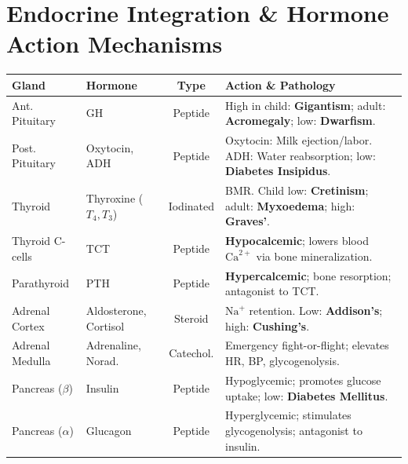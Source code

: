 \documentclass[10pt,twoside,openright]{book}
\begin{document}
\section{Endocrine Integration \& Hormone Action Mechanisms}

\begin{conceptbox}
\begin{center}
\scriptsize
\setlength{\tabcolsep}{2.5pt}
\renewcommand{\arraystretch}{1.15}
\begin{tabularx}{\linewidth}{|>{\raggedright\arraybackslash}p{1.6cm}|>{\raggedright\arraybackslash}p{1.8cm}|c|X|}
\hline
\textbf{Gland} & \textbf{Hormone} & \textbf{Type} & \textbf{Action \& Pathology} \\
\hline
Ant. Pituitary & GH & Peptide & High in child: \textbf{Gigantism}; adult: \textbf{Acromegaly}; low: \textbf{Dwarfism}. \\
Post. Pituitary & Oxytocin, ADH & Peptide & Oxytocin: Milk ejection/labor. ADH: Water reabsorption; low: \textbf{Diabetes Insipidus}. \\
Thyroid & Thyroxine ($T_4, T_3$) & Iodinated & BMR. Child low: \textbf{Cretinism}; adult: \textbf{Myxoedema}; high: \textbf{Graves'}. \\
Thyroid C-cells & TCT & Peptide & \textbf{Hypocalcemic}; lowers blood $\mathrm{Ca}^{2+}$ via bone mineralization. \\
Parathyroid & PTH & Peptide & \textbf{Hypercalcemic}; bone resorption; antagonist to TCT. \\
Adrenal Cortex & Aldosterone, Cortisol & Steroid & $\mathrm{Na}^+$ retention. Low: \textbf{Addison's}; high: \textbf{Cushing's}. \\
Adrenal Medulla & Adrenaline, Norad. & Catechol. & Emergency fight-or-flight; elevates HR, BP, glycogenolysis. \\
Pancreas ($\beta$) & Insulin & Peptide & Hypoglycemic; promotes glucose uptake; low: \textbf{Diabetes Mellitus}. \\
Pancreas ($\alpha$) & Glucagon & Peptide & Hyperglycemic; stimulates glycogenolysis; antagonist to insulin. \\
\hline
\end{tabularx}
\end{center}


\end{conceptbox}
\end{document}
